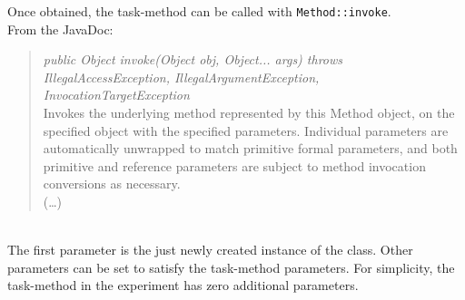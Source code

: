 Once obtained, the task-method can be called with \lstinline{Method::invoke}.\\
From the JavaDoc:
\begin{quote}
    \textit{public Object invoke(Object obj, Object... args) throws IllegalAccessException, IllegalArgumentException, InvocationTargetException}\\
    Invokes the underlying method represented by this Method object, on the specified object with the specified parameters. Individual parameters are automatically unwrapped to match primitive formal parameters, and both primitive and reference parameters are subject to method invocation conversions as necessary.\\
    (\dots)
\end{quote}~\textcite{javadoc:method}\\
The first parameter is the just newly created instance of the class.
Other parameters can be set to satisfy the task-method parameters.
For simplicity, the task-method in the experiment has zero additional parameters.